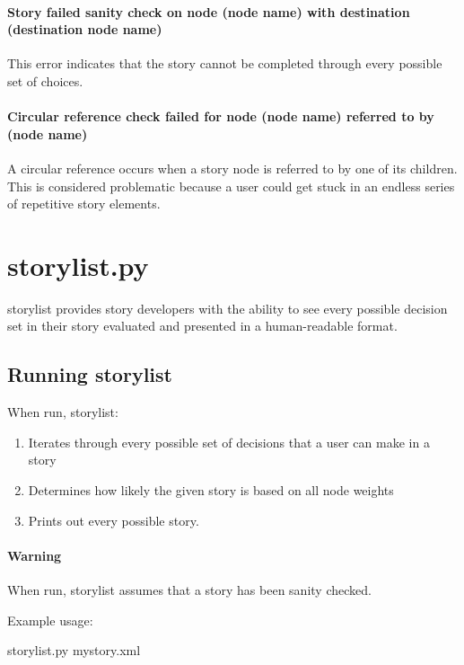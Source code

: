 \documentclass[12pt,letterpaper]{article}
\begin{document}
 \paragraph{Story failed sanity check on node (node name) with destination (destination node name)}
 This error indicates that the story cannot be completed through every possible set of choices.
 
 \paragraph{Circular reference check failed for node (node name) referred to by (node name)}
 A circular reference occurs when a story node is referred to by one of its children. This is considered 
 problematic because a user could get stuck in an endless series of repetitive story elements.
 
 
 \section{storylist.py}
 storylist provides story developers with the ability to see every possible decision set in their story evaluated and
 presented in a human-readable format.
 
 \subsection{Running storylist}
 When run, storylist:
 \begin{enumerate}
 \item Iterates through every possible set of decisions that a user can make in a story
 \item Determines how likely the given story is based on all node weights
 \item Prints out every possible story.
 \end{enumerate}
 
 \paragraph{Warning} When run, storylist assumes that a story has been sanity checked.
 
 Example usage:
 \begin{center}
 storylist.py mystory.xml
 \end{center}
 
\end{document}
